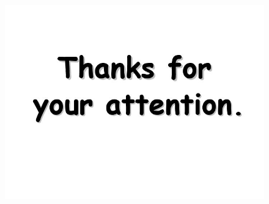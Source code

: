 \documentclass{beamer}
\begin{document}
\begin{frame}
	
\begin{figure}
	\centering
	\includegraphics[width=0.7\linewidth]{thanks}
		\label{fig:thanks}
\end{figure}
\end{frame}
\end{document}
